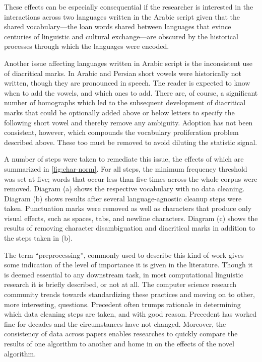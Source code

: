 \documentclass[12pt, oneside]{report}
\begin{document}
These effects can be especially consequential if the researcher is interested in the interactions across two languages written in the Arabic script given that the shared vocabulary---the loan words shared between languages that evince centuries of linguistic and cultural exchange---are obscured by the historical processes through which the languages were encoded.
\par
Another issue affecting languages written in Arabic script is the inconsistent use of diacritical marks.
In Arabic and Persian short vowels were historically not written, though they are pronounced in speech.
The reader is expected to know when to add the vowels, and which ones to add.
There are, of course, a significant number of homographs which led to the subsequent development of diacritical marks that could be optionally added above or below letters to specify the following short vowel and thereby remove any ambiguity.
Adoption has not been consistent, however, which compounds the vocabulary proliferation problem described above.
These too must be removed to avoid diluting the statistic signal.
\par
A number of steps were taken to remediate this issue, the effects of which are summarized in \autoref{fig:char-norm}.
For all steps, the minimum frequency threshold was set at five; words that occur less than five times across the whole corpus were removed.
Diagram (a) shows the respective vocabulary with no data cleaning.
Diagram (b) shows results after several language-agnostic cleanup steps were taken.
Punctuation marks were removed as well as characters that produce only visual effects, such as spaces, tabs, and newline characters.
Diagram (c) shows the results of removing character disambiguation and diacritical marks in addition to the steps taken in (b).
\par
The term ``preprocessing'', commonly used to describe this kind of work gives some indication of the level of importance it is given in the literature.
Though it is deemed essential to any downstream task, in most computational linguistic research it is briefly described, or not at all.
The computer science research community trends towards standardizing these practices and moving on to other, more interesting, questions.
Precedent often trumps rationale in determining which data cleaning steps are taken, and with good reason.
Precedent has worked fine for decades and the circumstances have not changed.
Moreover, the consistency of data across papers enables researches to quickly compare the results of one algorithm to another and home in on the effects of the novel algorithm.
\end{document}
